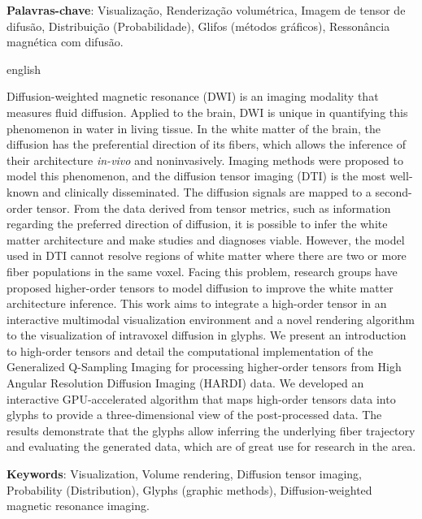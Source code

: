 \documentclass[
    12pt,                %
    oneside,            %
    a4paper,            %
    english,            %
    french,                %
    spanish,            %
    brazil                %
    ]{abntex2}
\begin{document}
\begin{resumo}
\vspace{\onelineskip}
\noindent\textbf{Palavras-chave}: Visualização, Renderização volumétrica, Imagem de tensor de difusão, Distribuição (Probabilidade), Glifos (métodos gráficos), Ressonância magnética com difusão.
\end{resumo}
\pagebreak
%
\begin{resumo}[Abstract]
 \begin{otherlanguage*}{english}

Diffusion-weighted magnetic resonance (DWI) is an imaging modality that measures fluid diffusion. Applied to the brain, DWI is unique in quantifying this phenomenon in water in living tissue. In the white matter of the brain, the diffusion has the preferential direction of its fibers, which allows the inference of their architecture \textit{in-vivo} and noninvasively. Imaging methods were proposed to model this phenomenon, and the diffusion tensor imaging (DTI) is the most well-known and clinically disseminated. The diffusion signals are mapped to a second-order tensor. From the data derived from tensor metrics, such as information regarding the preferred direction of diffusion, it is possible to infer the white matter architecture and make studies and diagnoses viable. However, the model used in DTI cannot resolve regions of white matter where there are two or more fiber populations in the same voxel. Facing this problem, research groups have proposed higher-order tensors to model diffusion to improve the white matter architecture inference. This work aims to integrate a high-order tensor in an interactive multimodal visualization environment and a novel rendering algorithm to the visualization of intravoxel diffusion in glyphs. We present an introduction to high-order tensors and detail the computational implementation of the Generalized Q-Sampling Imaging for processing higher-order tensors from High Angular Resolution Diffusion Imaging (HARDI) data. We developed an interactive GPU-accelerated algorithm that maps high-order tensors data into glyphs to provide a three-dimensional view of the post-processed data. The results demonstrate that the glyphs allow inferring the underlying fiber trajectory and evaluating the generated data, which are of great use for research in the area.


\vspace{\onelineskip}
\noindent\textbf{Keywords}: Visualization, Volume rendering, Diffusion tensor imaging, Probability (Distribution), Glyphs (graphic methods), Diffusion-weighted magnetic resonance imaging.
 \end{otherlanguage*}
\end{resumo}
\end{document}
